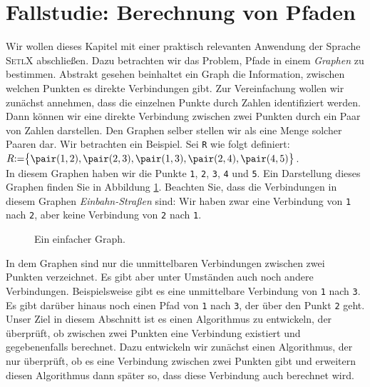 \section{Fallstudie: Berechnung von Pfaden}
Wir wollen  dieses Kapitel mit einer praktisch relevanten Anwendung der Sprache
\textsc{SetlX} abschließen.  Dazu betrachten wir das Problem, Pfade in
einem \emph{Graphen} zu bestimmen.  Abstrakt gesehen beinhaltet ein Graph die Information,
zwischen welchen Punkten es direkte Verbindungen gibt.
Zur Vereinfachung wollen wir zunächst annehmen, dass die einzelnen Punkte durch Zahlen
identifiziert werden.  Dann können wir eine direkte Verbindung zwischen zwei Punkten durch
ein Paar von Zahlen
darstellen.  Den Graphen selber stellen wir als eine Menge solcher Paaren dar.
Wir betrachten ein Beispiel. Sei \texttt{R} wie folgt definiert: \\[0.2cm]
\hspace*{0.5cm} 
$R \mathtt{:=} \bigl\{ \pair(1,2), \pair(2,3), \pair(1,3), \pair(2,4), \pair(4,5) \bigr\}$.
\\[0.2cm]
In diesem Graphen haben wir die Punkte \texttt{1},
\texttt{2}, \texttt{3}, \texttt{4} und \texttt{5}.  Ein Darstellung dieses Graphen finden
Sie in Abbildung \ref{fig:graph0}.
Beachten Sie, dass die Verbindungen in diesem Graphen
\emph{Einbahn-Straßen} sind:  Wir haben zwar eine Verbindung von \texttt{1} nach
\texttt{2}, aber keine Verbindung von \texttt{2} nach \texttt{1}.
 
\begin{figure}[!ht]
  \centering

  \caption{Ein einfacher Graph.}
  \label{fig:graph0}
\end{figure}



\noindent
In dem Graphen sind nur die unmittelbaren Verbindungen
zwischen zwei Punkten verzeichnet.  Es gibt aber unter Umständen auch noch
andere Verbindungen.  Beispielsweise gibt es eine unmittelbare Verbindung von
\texttt{1} nach \texttt{3}.  Es gibt darüber hinaus noch einen
Pfad von \texttt{1} nach \texttt{3}, der über den Punkt \texttt{2} geht.  
Unser Ziel in diesem Abschnitt ist es einen Algorithmus zu entwickeln, der überprüft, ob
zwischen zwei Punkten eine Verbindung existiert und gegebenenfalls berechnet.
Dazu entwickeln wir zunächst einen Algorithmus, der nur überprüft, ob es eine
Verbindung zwischen zwei Punkten gibt und erweitern diesen Algorithmus dann später so, dass diese
Verbindung auch berechnet wird.

